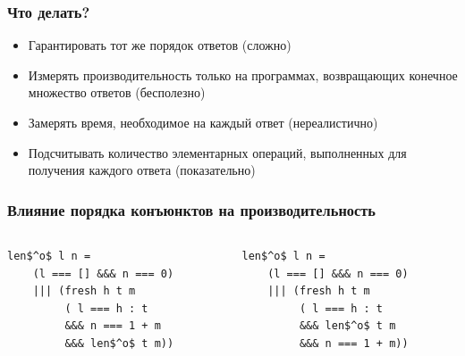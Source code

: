\documentclass{beamer}
\begin{document}
\begin{frame}[fragile]
  \frametitle{Что делать?}
  \begin{itemize}
    \item Гарантировать тот же порядок ответов \pause (сложно) \pause
    \item Измерять производительность только на программах, возвращающих конечное множество ответов \pause (бесполезно) \pause
    \item Замерять время, необходимое на каждый ответ \pause (нереалистично) \pause
    \item Подсчитывать количество элементарных операций, выполненных для получения каждого ответа \pause (показательно)
  \end{itemize}
\end{frame}


\begin{frame}[fragile]
  \frametitle{Влияние порядка конъюнктов на производительность}
\begin{columns}
  \begin{column}[]{0.5\textwidth}
    \begin{center}
      \begin{minipage}{4cm}
      \begin{lstlisting}[frame=single,backgroundcolor = \color{HappyGreen}]
  len$^o$ l n =
    (l === [] &&& n === 0)
    ||| (fresh h t m
         ( l === h : t
         &&& n === 1 + m
         &&& len$^o$ t m))
      \end{lstlisting}
      \end{minipage}
  \end{center}

  \end{column}
  \begin{column}[]{0.5\textwidth}
    \begin{center}
      \begin{minipage}{4cm}
      \begin{lstlisting}[frame=single,backgroundcolor = \color{SadRed}]
  len$^o$ l n =
    (l === [] &&& n === 0)
    ||| (fresh h t m
         ( l === h : t
         &&& len$^o$ t m
         &&& n === 1 + m))
      \end{lstlisting}
      \end{minipage}
  \end{center}

  \end{column}
\end{columns}
\end{frame}
\end{document}
